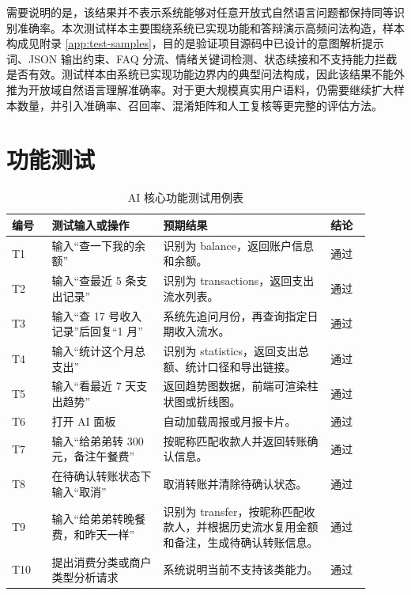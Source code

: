 \documentclass[bachelor, print]{xduthesis}
\begin{document}
需要说明的是，该结果并不表示系统能够对任意开放式自然语言问题都保持同等识别准确率。本次测试样本主要围绕系统已实现功能和答辩演示高频问法构造，样本构成见附录 \ref{app:test-samples}，目的是验证项目源码中已设计的意图解析提示词、JSON 输出约束、FAQ 分流、情绪关键词检测、状态续接和不支持能力拦截是否有效。测试样本由系统已实现功能边界内的典型问法构成，因此该结果不能外推为开放域自然语言理解准确率。对于更大规模真实用户语料，仍需要继续扩大样本数量，并引入准确率、召回率、混淆矩阵和人工复核等更完整的评估方法。

\section{功能测试}

\begin{table}[H]
    \centering
    \caption{AI 核心功能测试用例表}
    \label{tab:test-cases}
    \begin{tabular}{|p{0.1\linewidth}|p{0.28\linewidth}|p{0.42\linewidth}|p{0.1\linewidth}|}
        \hline
        编号 & 测试输入或操作 & 预期结果 & 结论 \\
        \hline
        T1 & 输入“查一下我的余额” & 识别为 balance，返回账户信息和余额。 & 通过 \\
        \hline
        T2 & 输入“查最近 5 条支出记录” & 识别为 transactions，返回支出流水列表。 & 通过 \\
        \hline
        T3 & 输入“查 17 号收入记录”后回复“1 月” & 系统先追问月份，再查询指定日期收入流水。 & 通过 \\
        \hline
        T4 & 输入“统计这个月总支出” & 识别为 statistics，返回支出总额、统计口径和导出链接。 & 通过 \\
        \hline
        T5 & 输入“看最近 7 天支出趋势” & 返回趋势图数据，前端可渲染柱状图或折线图。 & 通过 \\
        \hline
        T6 & 打开 AI 面板 & 自动加载周报或月报卡片。 & 通过 \\
        \hline
        T7 & 输入“给弟弟转 300 元，备注午餐费” & 按昵称匹配收款人并返回转账确认信息。 & 通过 \\
        \hline
        T8 & 在待确认转账状态下输入“取消” & 取消转账并清除待确认状态。 & 通过 \\
        \hline
        T9 & 输入“给弟弟转晚餐费，和昨天一样” & 识别为 transfer，按昵称匹配收款人，并根据历史流水复用金额和备注，生成待确认转账信息。 & 通过 \\
        \hline
        T10 & 提出消费分类或商户类型分析请求 & 系统说明当前不支持该类能力。 & 通过 \\

\end{tabular}
\end{table}
\end{document}
